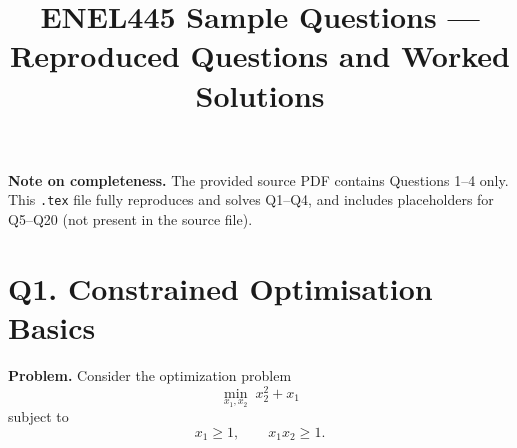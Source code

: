 \documentclass[11pt]{article}
\title{ENEL445 Sample Questions --- Reproduced Questions and Worked Solutions}
\author{}
\date{}
\begin{document}
\maketitle

\noindent
\textbf{Note on completeness.} The provided source PDF contains Questions 1--4 only. This \texttt{.tex} file fully reproduces and solves Q1--Q4, and includes placeholders for Q5--Q20 (not present in the source file).

\section*{Q1. Constrained Optimisation Basics}

\noindent \textbf{Problem.} Consider the optimization problem
\[
\min_{x_1,x_2}\; x_2^{2} + x_1
\]
subject to
\[
x_1 \ge 1,\qquad x_1 x_2 \ge 1.
\]
\end{document}
